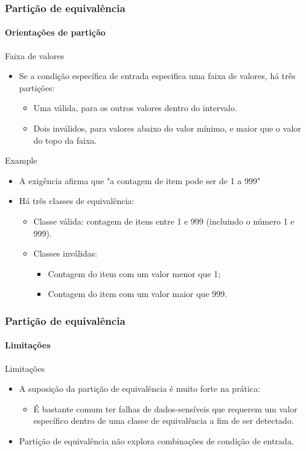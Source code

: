 \begin{frame}
\frametitle{Partição de equivalência}
\framesubtitle{Orientações de partição}

\begin{block:fact}{Faixa de valores}
\begin{itemize}
	\item Se a condição específica de entrada especifica uma faixa de valores, há três partições:
	\begin{itemize}
		\item Uma válida, para os outros valores dentro do intervalo.

		\item Dois inválidos, para valores abaixo do valor mínimo, e maior que o valor do topo da faixa.
	\end{itemize}
\end{itemize}
\end{block:fact}


\begin{block}{Example}
\begin{itemize}
	\item A exigência afirma que "a contagem de item pode ser de 1 a 999"

	\item Há três classes de equivalência:
	\begin{itemize}
		\item Classe válida: contagem de itens entre 1 e 999 (incluindo o número 1 e 999).
		\item Classes inválidas:
		\begin{itemize}
			\item Contagem do item com um valor menor que 1;
			\item Contagem do item com um valor maior que 999.
		\end{itemize}
	\end{itemize}
\end{itemize}
\end{block}
\end{frame}



\begin{frame}
\frametitle{Partição de equivalência}
\framesubtitle{Limitações}

\begin{block:fact}{Limitações}
\begin{itemize}
	\item A suposição da partição de equivalência é muito forte na prática:
	\begin{itemize}
		\item É bastante comum ter falhas de dados-sensíveis que requerem um
		valor específico dentro de uma classe de equivalência a fim de ser detectado.
	\end{itemize}

	\item Partição de equivalência não explora combinações de condição de entrada.
\end{itemize}
\end{block:fact}
\end{frame}